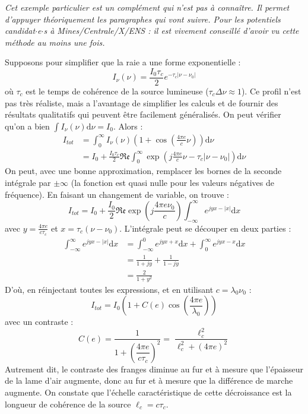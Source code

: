 \documentclass[11pt,fleqn]{book} %
\newcommand{\dd}{\mathrm{d}}
\begin{document}
\begin{example}
	\textit{Cet exemple particulier est un complément qui n'est pas à connaître. Il permet d'appuyer théoriquement les paragraphes qui vont suivre. Pour les potentiels candidat$\cdot$e$\cdot$s à Mines/Centrale/X/ENS : il est vivement conseillé d'avoir vu cette méthode au moins une fois.}
	
	Supposons pour simplifier que la raie a une forme exponentielle :
	\begin{equation}
		I_\nu(\nu) = \frac{I_0 \tau_c}{2} e^{-\tau_c|\nu-\nu_0|}
	\end{equation}
	où $\tau_c$ est le temps de cohérence de la source lumineuse ($\tau_c \Delta \nu \approx 1$). Ce profil n'est pas très réaliste, mais a l'avantage de simplifier les calculs et de fournir des résultats qualitatifs qui peuvent être facilement généralisés. On peut vérifier qu'on a bien $\int I_\nu(\nu) \dd \nu = I_0$.
	Alors :
	\begin{align}
		I_{tot} &= \int_0^\infty I_\nu(\nu) \left( 1 + \cos\left(\frac{4\pi e}{c} \nu \right) \right) \dd \nu \\
		&= I_0 + \frac{I_0 \tau_c}{2} \mathfrak{Re} \int_0^\infty \exp\left( j \frac{4 \pi e}{c} \nu - \tau_c |\nu-\nu_0| \right) \dd \nu 
	\end{align}
	On peut, avec une bonne approximation, remplacer les bornes de la seconde intégrale par $\pm \infty$ (la fonction est quasi nulle pour les valeurs négatives de fréquence). En faisant un changement de variable, on trouve :
	\begin{equation}
		I_{tot} = I_0 + \frac{I_0}{2} \mathfrak{Re} \exp\left(j\frac{4 \pi e \nu_0}{c}\right) \int_{-\infty}^\infty e^{j y x - |x|} \dd x
	\end{equation}
	avec $y = \frac{4 \pi e}{c \tau_c}$ et $x = \tau_c(\nu-\nu_0)$. L'intégrale peut se découper en deux parties :
	\begin{align}
		\int_{-\infty}^\infty e^{j y x - |x|} \dd x &= \int_{-\infty}^0 e^{j y x + x} \dd x + \int_0^\infty e^{j y x - x} \dd x \\
		&= \frac{1}{1 + jy} + \frac{1}{1-jy} \\
		&= \frac{2}{1 + y^2}
	\end{align}
	D'où, en réinjectant toutes les expressions, et en utilisant $c = \lambda_0 \nu_0$ :
	\begin{equation}
		I_{tot} = I_0 \left( 1 + C(e) \cos\left(\frac{4 \pi e}{\lambda_0} \right) \right)
	\end{equation}
	avec un contraste :
	\begin{equation}
		C(e) = \dfrac{1}{1 + \left( \dfrac{4 \pi e}{c \tau_c}\right)^2} = \frac{\ell_c^2}{\ell_c^2 + (4 \pi e)^2}
	\end{equation}
	Autrement dit, le contraste des franges diminue au fur et à mesure que l'épaisseur de la lame d'air augmente, donc au fur et à mesure que la différence de marche augmente. On constate que l'échelle caractéristique de cette décroissance est la longueur de cohérence de la source $\ell_c = c \tau_c$.
\end{example}
\end{document}
